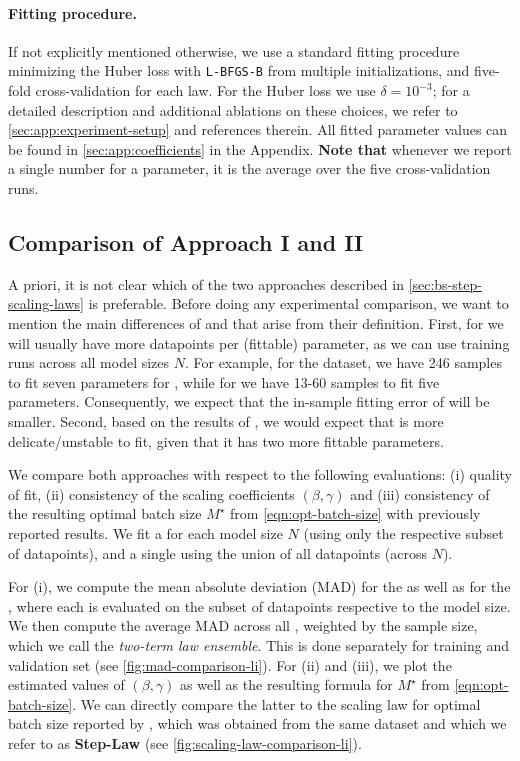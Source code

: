 \documentclass[12pt,a4paper,twoside]{article}
\begin{document}
\paragraph{Fitting procedure.} If not explicitly mentioned otherwise, we use a standard fitting procedure minimizing the Huber loss with \texttt{L-BFGS-B} from multiple initializations, and five-fold cross-validation for each law. For the Huber loss we use $\delta=10^{-3}$; for a detailed description and additional ablations on these choices, we refer to \cref{sec:app:experiment-setup} and references therein. All fitted parameter values can be found in \cref{sec:app:coefficients} in the Appendix. \textbf{Note that} whenever we report a single number for a parameter, it is the average over the five cross-validation runs.

\subsection{Comparison of Approach I and II}\label{sec:experiments:compare-2tl-3tl}

A priori, it is not clear which of the two approaches described in \cref{sec:bs-step-scaling-laws} is preferable.
Before doing any experimental comparison, we want to mention the main differences of \ttl{} and \tttl{} that arise from their definition. First, for \tttl{} we will usually have more datapoints per (fittable) parameter, as we can use training runs across all model sizes $N$. For example, for the \li{} dataset, we have 246 samples to fit seven parameters for \tttl{}, while for \ttl{} we have 13-60 samples to fit five parameters. Consequently, we expect that the in-sample fitting error of \ttl{} will be smaller. Second, based on the results of \citet{Li2025a}, we would expect that \tttl{} is more delicate/unstable to fit, given that it has two more fittable parameters.


We compare both approaches with respect to the following evaluations: (i) quality of fit, (ii) consistency of the scaling coefficients $(\beta,\gamma)$ and (iii) consistency of the resulting optimal batch size $M^\star$ from \eqref{eqn:opt-batch-size} with previously reported results.
We fit a \ttl{} for each model size $N$ (using only the respective subset of datapoints), and a single \tttl{} 
using the union of all datapoints (across $N$).



For (i), we compute the mean absolute deviation (MAD) for the \tttl{} as well as for the \ttl{}, where each \ttl{} is evaluated on the subset of datapoints respective to the model size. We then compute the average MAD across all \ttl{}, weighted by the sample size, which we call the \emph{two-term law ensemble}. This is done separately for training and validation set (see \cref{fig:mad-comparison-li}). For (ii) and (iii), we plot the estimated values of $(\beta, \gamma)$ as well as the resulting formula for $M^\star$ from \eqref{eqn:opt-batch-size}. We can directly compare the latter to the scaling law for optimal batch size reported by \citet{Li2025}, which was obtained from the same dataset and which we refer to as \textbf{Step-Law} (see \cref{fig:scaling-law-comparison-li}).
\end{document}
